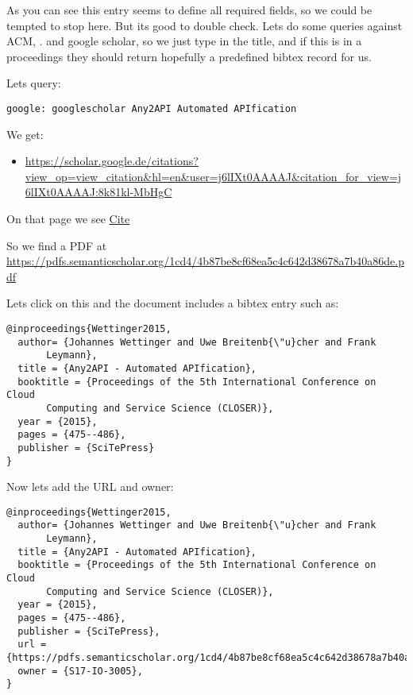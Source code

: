 As you can see this entry seems to define all required fields, so we
could be tempted to stop here. But its good to double check. Lets do
some queries against ACM, . and google scholar, so we just type in the
title, and if this is in a proceedings they should return hopefully a
predefined bibtex record for us.

Lets query:

\begin{verbatim}
google: googlescholar Any2API Automated APIfication
\end{verbatim}

We get:

\begin{itemize}
\tightlist
\item
  \url{https://scholar.google.de/citations?view_op=view_citation\&hl=en\&user=j6lIXt0AAAAJ\&citation_for_view=j6lIXt0AAAAJ:8k81kl-MbHgC}
\end{itemize}

On that page we see
\href{https://scholar.google.com/scholar_lookup?title=Automated+drug+dispensing+system+reduces+medication+errors+in+an+intensive+care+setting\&author=Chapuis\&publication_year=2010\#}{Cite}

So we find a PDF at
\url{https://pdfs.semanticscholar.org/1cd4/4b87be8cf68ea5c4c642d38678a7b40a86de.pdf}

Lets click on this and the document includes a bibtex entry such as:

\begin{verbatim}
@inproceedings{Wettinger2015, 
  author= {Johannes Wettinger and Uwe Breitenb{\"u}cher and Frank
       Leymann},
  title = {Any2API - Automated APIfication},
  booktitle = {Proceedings of the 5th International Conference on Cloud
       Computing and Service Science (CLOSER)},
  year = {2015},
  pages = {475--486},
  publisher = {SciTePress}
} 
\end{verbatim}

Now lets add the URL and owner:

\begin{verbatim}
@inproceedings{Wettinger2015, 
  author= {Johannes Wettinger and Uwe Breitenb{\"u}cher and Frank
       Leymann},
  title = {Any2API - Automated APIfication},
  booktitle = {Proceedings of the 5th International Conference on Cloud
       Computing and Service Science (CLOSER)},
  year = {2015},
  pages = {475--486},
  publisher = {SciTePress},
  url ={https://pdfs.semanticscholar.org/1cd4/4b87be8cf68ea5c4c642d38678a7b40a86de.pdf},
  owner = {S17-IO-3005},
} 
\end{verbatim}

